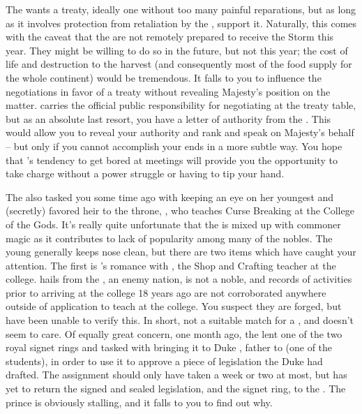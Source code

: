 \documentclass[char]{GL2020}
\begin{document}
The \cQueen{\Majesty} wants a treaty, ideally one without too many painful reparations, but as long as it involves protection from retaliation by the \pTech{}, \cQueen{\they} support it. Naturally, this comes with the caveat that the \pFarm{} are not remotely prepared to receive the Storm this year. They might be willing to do so in the future, but not this year; the cost of life and destruction to the harvest (and consequently most of the food supply for the whole continent) would be tremendous. It falls to you to influence the negotiations in favor of a treaty without revealing \cQueen{\Their} Majesty's position on the matter. \cEvil{} carries the official public responsibility for negotiating at the treaty table, but as an absolute last resort, you have a letter of authority from the \cQueen{\Majesty}. This would allow you to reveal your authority and rank and speak on \cQueen{\their} Majesty's behalf -- but only if you cannot accomplish your ends in a more subtle way. You hope that \cEvil{}'s tendency to get bored at meetings will provide you the opportunity to take charge without a power struggle or having to tip your hand.

The \cQueen{\Majesty} also tasked you some time ago with keeping an eye on her youngest \cPrince{\child} and (secretly) favored heir to the throne, \cPrince{\full}, who teaches Curse Breaking at the College of the Gods. It's really quite unfortunate that the \cPrince{\Heir} is mixed up with commoner magic as it contributes to \cPrince{\their} lack of popularity among many of the nobles. The young \cPrince{\heir} generally keeps \cPrince{\their} nose clean, but there are two items which have caught your attention. The first is \cPrince{}'s romance with \cPirate{\full}, the Shop and Crafting teacher at the college. \cPirate{} hails from the \pShip{}, an enemy nation, is not a noble, and records of \cPirate{\their} activities prior to arriving at the college 18 years ago are not corroborated anywhere outside of \cPirate{\their} application to teach at the college. You suspect they are forged, but have been unable to verify this. In short, \cPirate{\theyare} not a suitable match for a \cPrince{\heir}, and \cPrince{} doesn't seem to care. Of equally great concern, one month ago, the \cQueen{\Majesty} lent \cPrince{} one of the two royal signet rings and tasked \cPrince{\them} with bringing it to Duke \cChupStudent{\formal}, father to \cChupStudent{\full} (one of the students), in order to use it to approve a piece of legislation the Duke had drafted. The assignment should only have taken a week or two at most, but \cPrince{} has yet to return the signed and sealed legislation, and the signet ring, to the \cQueen{\Majesty}. The prince is obviously stalling, and it falls to you to find out why. 
\end{document}
